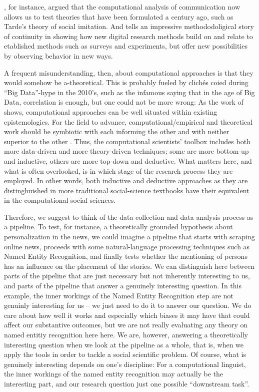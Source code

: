\citet{Gonzalez-Bailon2017}, for instance, argued that the
computational analysis of communication now allows us to test theories
that have been formulated a century ago, such as Tarde's theory of
social imitation. And \citet{Salganik2019} tells an impressive
methododoligical story of continuity in showing how new digital
research methods build on and relate to etablished methods such as
surveys and experiments, but offer new possibilities by observing
behavior in new ways.

A frequent misunderstanding, then, about computational approaches is
that they would somehow be a-theoretical. This is probably fueled by
clich\'{e}s coied during ``Big Data''-hype in the 2010's, such as the
infamous saying that in the age of Big Data, correlation is enough,
but one could not be more wrong: As the work of \cite{Kitchin2014,Kitchin2014data} shows, computational approaches can
be well situated within existing epistemologies.
For the field to advance, computational/empirical and theoretical work should be symbiotic with each informing the other
and with neither superior to the other \cite{margolin19}.
Thus, the computational
scientists' toolbox includes both more data-driven and more
theory-driven techniques; some are more bottom-up and inductive,
others are more top-down and deductive. What matters here, and what is
often overlooked, is in which stage of the research process they are
employed. In other words, both inductive and deductive approaches as
they are distinghuished in more traditional social-science textbooks
\citep[e.g.,][]{Bryman2012} have their equivalent in the computational
social sciences.

Therefore, we suggest to think of the data collection and data
analysis process as a pipeline. To test, for instance, a theoretically
grounded hypothesis about personalization in the news, we could
imagine a pipeline that starts with scraping online news, proceeds
with some natural-language processing techniques such as Named Entity
Recognition, and finally tests whether the mentioning of persons has
an influence on the placement of the stories. We can distinguish here
between parts of the pipeline that are just necessary but not
inherently interesting to us, and parts of the pipeline that answer a
genuinely interesting question. In this example, the inner workings of
the Named Entity Recognition step are not genuinly interesting for us
-- we just need to do it to answer our question.
We do care about how well it works and especially which biases it may have that could affect our substantive outcomes,
but we are not really evaluating any theory on named entitiy recognition here here.
We are, however, answering a theoretically
interesting question when we look at the pipeline as a whole,
that is, when we apply the tools in order to tackle a social scientific problem. 
Of course, what is genuinely interesting depends on one's discipline: For a
computational linguist, the inner workings of the named entity recognition
may actually be the interesting part, and our research question just one
possible ``downstream task''.

